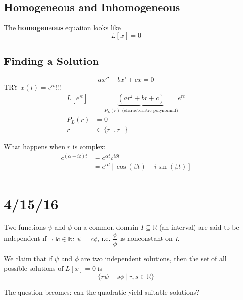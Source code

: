 \documentclass[12pt]{article}
\begin{document}
\subsection{Homogeneous and Inhomogeneous}
The \textbf{homogeneous} equation looks like
\[ L[x] = 0 \]

\subsection{Finding a Solution}
\[ ax'' + bx' + cx = 0 \]
TRY $x(t) = e^{rt}$!!!
\[
\begin{aligned}
  L[e^{rt}] &= \underbrace{(ar^2+br+c)}_{P_L(r) \text{ (characteristic polynomial)}}e^{rt} \\
  P_L(r) &= 0 \\
  r &\in \{ r^-,r^+ \} 
\end{aligned}
\]

What happens when $r$ is complex:
\[
\begin{aligned}
  e^{(\alpha + i\beta)t} &= e^{\alpha t}e^{i\beta t} \\
  &= e^{\alpha t}[\cos(\beta t) + i\sin(\beta t)] \\
\end{aligned}
\]

\section{4/15/16}
\begin{definition}
Two functions $\psi$ and $\phi$ on a common domain $I \subseteq \mathbb{R}$ (an interval) are said to be independent if $\lnot \exists c \in \mathbb{R}: \ \psi = c\phi$, i.e. $\dfrac{\psi}{\phi}$ is nonconstant on $I$.
\end{definition}

We claim that if $\psi$ and $\phi$ are two independent solutions, then the set of all possible solutions of $L[x] = 0$ is
\[ \{ r\psi + s\phi \ | \ r,s \in \mathbb{R} \} \]

The question becomes: can the quadratic yield suitable solutions?
\end{document}
